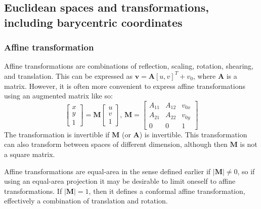 \documentclass{amsart}[12pt]
\begin{document}
\subsection{Euclidean spaces and transformations, including barycentric coordinates}

\subsubsection{Affine transformation}
Affine transformations are combinations of reflection, scaling, rotation,
shearing, and translation. This can be expressed as $\mathbf v = \mathbf A [u,
v]^T + v_0$, where $\mathbf A$ is a matrix. However, it is often more
convenient to express affine transformations using an augmented matrix like so:
\begin{equation}
  \begin{bmatrix}  x \\  y \\  1 \end{bmatrix}
   = \mathbf M
    \begin{bmatrix}  u \\  v \\  1 \end{bmatrix},\,
    \mathbf M = \begin{bmatrix}
       A_{11} & A_{12} & v_{0x} \\
       A_{21} & A_{22} & v_{0y} \\
       0 & 0 & 1
       \end{bmatrix}
\end{equation}
The transformation is invertible if $\mathbf M$ (or $\mathbf A$) is
invertible. This transformation can also transform between spaces of different
dimension, although then $\mathbf M$ is not a square matrix.

Affine transformations are equal-area in the sense defined earlier if
$|\mathbf M| \ne 0$, so if using an equal-area projection it may be desirable
to limit oneself to affine transformations. If $|\mathbf M| = 1$, then it defines a conformal affine transformation, effectively a combination of translation and rotation.
\end{document}
